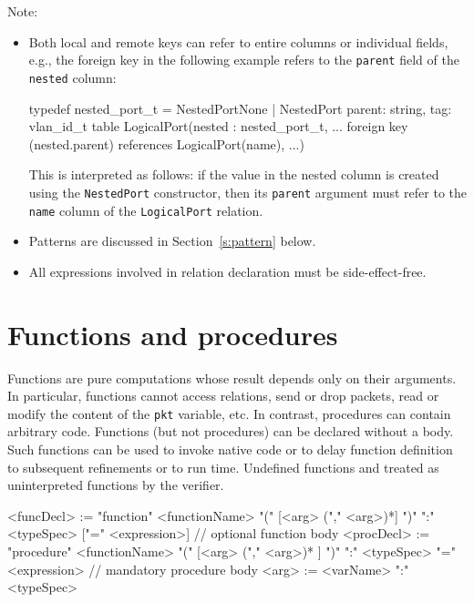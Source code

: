 \documentclass{report}
\newcommand{\src}[1]{\texttt{#1}}
\begin{document}
Note:
\begin{itemize}
    \item Both local and remote keys can refer to entire columns or 
          individual fields, e.g., the foreign key in the following 
          example refers to the \src{parent} field of the 
          \src{nested} column:
\begin{ccnlisting}{}
typedef nested_port_t = NestedPortNone
                      | NestedPort {parent: string, tag: vlan_id_t}
table LogicalPort(nested    : nested_port_t,
                  ...
                  foreign key (nested.parent) references LogicalPort(name),
                  ...)
\end{ccnlisting}
          This is interpreted as follows: if the value in the nested
          column is created using the \src{NestedPort} constructor,
          then its \src{parent} argument must refer to the \src{name}
          column of the \src{LogicalPort} relation.
    \item Patterns are discussed in Section~\ref{s:pattern} below.
    \item All expressions involved in relation declaration must be side-effect-free.
\end{itemize}



\section{Functions and procedures}

Functions are pure computations whose result depends only on their arguments.  
In particular, functions cannot access relations, send or drop packets, read 
or modify the content of the \src{pkt} variable, etc.  In contrast, 
procedures can contain arbitrary code.  Functions (but not procedures) can
be declared without a body.  Such functions can be used to invoke native code 
or to delay function definition to subsequent refinements or to run time.  
Undefined functions and treated as uninterpreted functions by the verifier.

\begin{bnflisting}{}
<funcDecl> := "function" <functionName> "(" [<arg> ("," <arg>)*] ")" ":" <typeSpec>
                         ["=" <expression>] // optional function body
<procDecl> := "procedure" <functionName> "(" [<arg> ("," <arg>)* ] ")" ":" <typeSpec>
                         "=" <expression>   // mandatory procedure body
<arg> := <varName> ":" <typeSpec>
\end{bnflisting}
\end{document}
